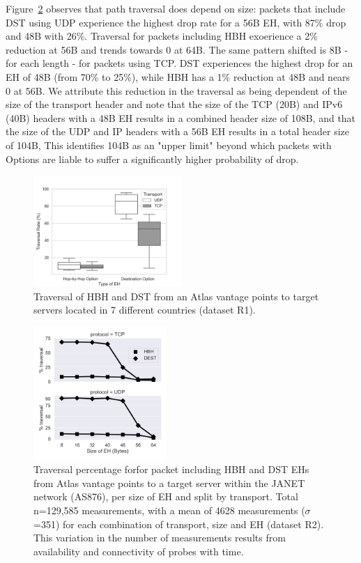 \documentclass[conference]{IEEEtran}
\begin{document}
Figure~\ref{fig:sizes} observes that path traversal does depend on size: packets that include DST using UDP experience the highest drop rate for a 56B EH, with  87\% drop and 48B with 26\%. Traversal for packets including HBH exoerience a 2\% reduction at 56B and trends towards 0 at 64B.
The same pattern shifted is 8B - for each length - for packets  using TCP. DST experiences the highest drop for an EH of 48B (from 70\% to 25\%), while HBH has a 1\% reduction at 48B and nears 0 at 56B.
We attribute this reduction in the traversal as being dependent of the size of the transport header and note that the size of the TCP (20B) and IPv6 (40B) headers with a 48B EH results in a combined header size of 108B, and that the size of the UDP and IP headers with a 56B EH results in a total header size of 104B, This identifies  104B as an "upper limit" beyond which packets with Options are liable to suffer a significantly higher probability of drop.

\begin{figure}
\centering
  \includegraphics[width=0.5\textwidth]{all_traversal.png}
  \caption{Traversal of HBH and DST from an Atlas vantage points to target servers located in 7 different countries (dataset R1). }
  \label{fig:countrybox}
\end{figure}

\begin{figure}
\centering
  \includegraphics[width=0.45\textwidth]{sizes.png}
  \caption{Traversal percentage forfor packet including HBH and DST EHs from Atlas vantage points to a target server within the JANET network (AS876), per size of EH and split by transport.  Total n=129,585 measurements, with a mean of 4628 measurements ($\sigma$=351) for each combination of transport, size and EH  (dataset R2). This variation in the number of measurements results from availability and connectivity of  probes  with time.}
  \label{fig:sizes}
\end{figure}
\end{document}

